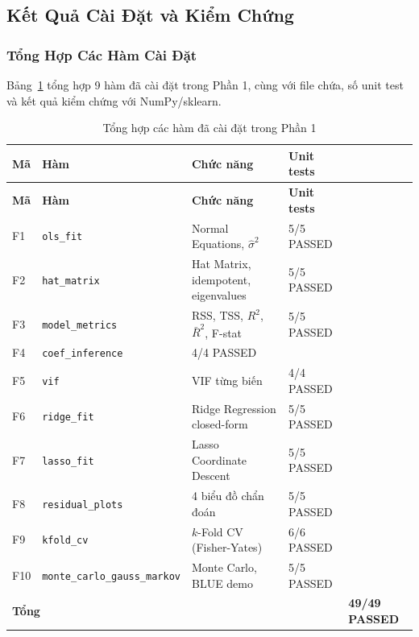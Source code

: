 \subsection{Kết Quả Cài Đặt và Kiểm Chứng}

\subsubsection{Tổng Hợp Các Hàm Cài Đặt}

Bảng~\ref{tab:functions} tổng hợp 9 hàm đã cài đặt trong Phần 1, cùng
với file chứa, số unit test và kết quả kiểm chứng với NumPy/sklearn.

\begin{longtable}{@{}p{}p{}p{}
                    p{}p{}@{}}
\caption{Tổng hợp các hàm đã cài đặt trong Phần 1}
\label{tab:functions} \\
\hline
\textbf{Mã} & \textbf{Hàm} & \textbf{Chức năng} & \textbf{Unit tests} \\
\hline
\endfirsthead
\hline
\textbf{Mã} & \textbf{Hàm} & \textbf{Chức năng} & \textbf{Unit tests} \\
\hline
\endhead
F1 & \texttt{ols\_fit} & Normal Equations, $\hat{\sigma}^2$ & 5/5 PASSED \\
F2 & \texttt{hat\_matrix} & Hat Matrix, idempotent, eigenvalues & 5/5 PASSED \\
F3 & \texttt{model\_metrics} & RSS, TSS, $R^2$, $\bar{R}^2$, F-stat & 5/5 PASSED \\
F4 & \texttt{coef\_inference} & 4/4 PASSED \\
F5 & \texttt{vif} &  VIF từng biến & 4/4 PASSED \\
F6 & \texttt{ridge\_fit} & Ridge Regression closed-form & 5/5 PASSED \\
F7 & \texttt{lasso\_fit} & Lasso Coordinate Descent & 5/5 PASSED \\
F8 & \texttt{residual\_plots} & 4 biểu đồ chẩn đoán & 5/5 PASSED \\
F9 & \texttt{kfold\_cv} & $k$-Fold CV (Fisher-Yates) & 6/6 PASSED \\
F10 & \texttt{monte\_carlo\_gauss\_markov} & Monte Carlo, BLUE demo & 5/5 PASSED \\
\hline
\multicolumn{4}{l}{\textbf{Tổng}} & \textbf{49/49 PASSED} \\
\hline
\end{longtable}

